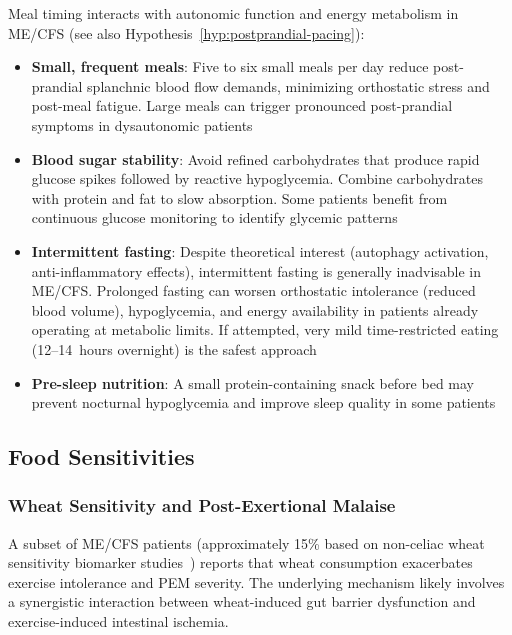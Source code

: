 Meal timing interacts with autonomic function and energy metabolism in ME/CFS (see also Hypothesis~\ref{hyp:postprandial-pacing}):

\begin{itemize}
    \item \textbf{Small, frequent meals}: Five to six small meals per day reduce post-prandial splanchnic blood flow demands, minimizing orthostatic stress and post-meal fatigue. Large meals can trigger pronounced post-prandial symptoms in dysautonomic patients
    \item \textbf{Blood sugar stability}: Avoid refined carbohydrates that produce rapid glucose spikes followed by reactive hypoglycemia. Combine carbohydrates with protein and fat to slow absorption. Some patients benefit from continuous glucose monitoring to identify glycemic patterns
    \item \textbf{Intermittent fasting}: Despite theoretical interest (autophagy activation, anti-inflammatory effects), intermittent fasting is generally inadvisable in ME/CFS. Prolonged fasting can worsen orthostatic intolerance (reduced blood volume), hypoglycemia, and energy availability in patients already operating at metabolic limits. If attempted, very mild time-restricted eating (12--14~hours overnight) is the safest approach
    \item \textbf{Pre-sleep nutrition}: A small protein-containing snack before bed may prevent nocturnal hypoglycemia and improve sleep quality in some patients
\end{itemize}

\subsection{Food Sensitivities}
\label{sec:food-sensitivities-wheat}

\subsubsection{Wheat Sensitivity and Post-Exertional Malaise}

A subset of ME/CFS patients (approximately 15\% based on non-celiac wheat sensitivity biomarker studies~\cite{Uhde2018}) reports that wheat consumption exacerbates exercise intolerance and PEM severity. The underlying mechanism likely involves a synergistic interaction between wheat-induced gut barrier dysfunction and exercise-induced intestinal ischemia.

